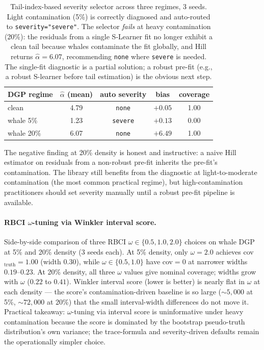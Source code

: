 \begin{table}[!t]
\centering
\small
\begin{tabular}{lcccc}
\toprule
DGP regime & $\hat\alpha$ (mean) & auto severity & bias & coverage \\
\midrule
clean              & 4.79 & \texttt{none}   & $+0.05$  & 1.00 \\
whale 5\%          & 1.23 & \texttt{severe} & $+0.13$  & 0.00 \\
whale 20\%         & 6.07 & \texttt{none}   & $+6.49$  & 1.00 \\
\bottomrule
\end{tabular}
\caption{Tail-index-based severity selector across three regimes,
3 seeds. Light contamination (5\%) is correctly diagnosed and
auto-routed to \texttt{severity="severe"}. The selector \emph{fails}
at heavy contamination (20\%): the residuals from a single S-Learner
fit no longer exhibit a clean tail because whales contaminate the
fit globally, and Hill returns $\hat\alpha = 6.07$, recommending
\texttt{none} where \texttt{severe} is needed. The single-fit
diagnostic is a partial solution; a robust pre-fit (e.g., a robust
S-learner before tail estimation) is the obvious next step.}
\label{tab:auto_severity}
\end{table}

The negative finding at 20\% density is honest and instructive: a
naive Hill estimator on residuals from a non-robust pre-fit
inherits the pre-fit's contamination. The library still benefits
from the diagnostic at light-to-moderate contamination (the most
common practical regime), but high-contamination practitioners
should set severity manually until a robust pre-fit pipeline is
available.

\paragraph{RBCI $\omega$-tuning via Winkler interval score.}
Side-by-side comparison of three RBCI $\omega \in \{0.5, 1.0, 2.0\}$
choices on whale DGP at 5\% and 20\% density (3 seeds each).
At 5\% density, only $\omega = 2.0$ achieves cov$_{\text{truth}} = 1.00$
(width $0.30$), while $\omega \in \{0.5, 1.0\}$ have cov$=0$ at
narrower widths $0.19$--$0.23$. At 20\% density, all three
$\omega$ values give nominal coverage; widths grow with $\omega$
($0.22$ to $0.41$). Winkler interval score (lower is better) is
nearly flat in $\omega$ at each density --- the score's
contamination-driven baseline is so large ($\sim 5{,}000$ at 5\%,
$\sim 72{,}000$ at 20\%) that the small interval-width differences
do not move it. Practical takeaway: $\omega$-tuning via interval
score is uninformative under heavy contamination because the
score is dominated by the bootstrap pseudo-truth distribution's
own variance; the trace-formula and severity-driven defaults
remain the operationally simpler choice.

